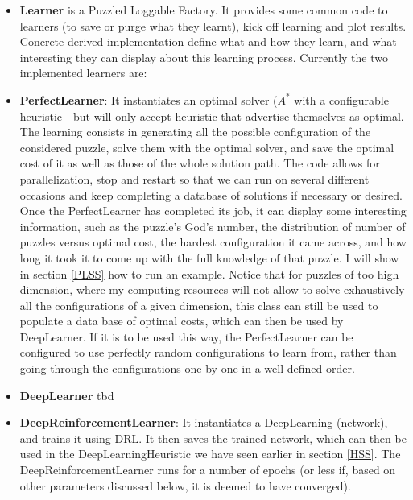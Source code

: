 \begin{itemize}
\item \textbf{Learner} is a Puzzled Loggable Factory. It provides some common code to learners (to save or purge what they learnt), kick off learning and plot results. Concrete derived implementation define what and how they learn, and what interesting they can display about this learning process. Currently the two implemented learners are:
\item \textbf{PerfectLearner}: It instantiates an optimal solver ($A^{*}$ with a configurable heuristic - but will only accept heuristic that advertise themselves as optimal. The learning consists in generating all the possible configuration of the considered puzzle, solve them with the optimal solver, and save the optimal cost of it as well as those of the whole solution path. The code allows for parallelization, stop and restart so that we can run on several different occasions and keep completing a database of solutions if necessary or desired. Once the PerfectLearner has completed its job, it can display some interesting information, such as the puzzle's God's number, the distribution of number of puzzles versus optimal cost, the hardest configuration it came across, and how long it took it to come up with the full knowledge of that puzzle. I will show in section \ref{PLSS} how to run an example. Notice that for puzzles of too high dimension, where my computing resources will not allow to solve exhaustively all the configurations of a given dimension, this class can still be used to populate a data base of optimal costs, which can then be used by DeepLearner. If it is to be used this way, the PerfectLearner can be configured to use perfectly random configurations to learn from, rather than going through the configurations one by one in a well defined order.

\item \textbf{DeepLearner} tbd
\item \textbf{DeepReinforcementLearner}: It instantiates a DeepLearning (network), and trains it using DRL. It then saves the trained network, which can then be used in the DeepLearningHeuristic we have seen earlier in section \ref{HSS}. The DeepReinforcementLearner runs for a number of epochs (or less if, based on other parameters discussed below, it is deemed to have converged). 


\end{itemize}



